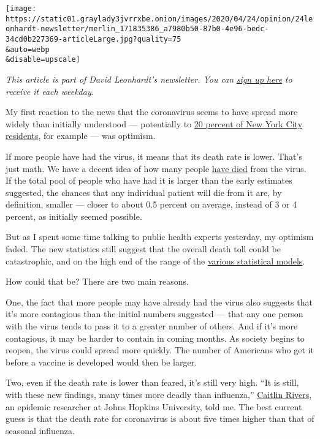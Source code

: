 \texttt{[image: https://static01.graylady3jvrrxbe.onion/images/2020/04/24/opinion/24leonhardt-newsletter/merlin\_171835386\_a7980b50-87b0-4e96-bedc-34cd0b227369-articleLarge.jpg?quality=75\\\&auto=webp\\\&disable=upscale]}

\emph{This article is part of David Leonhardt's newsletter. You can}
\href{https://www.nytimes3xbfgragh.onion/newsletters/opiniontoday?action=click\&module=Intentional\&pgtype=Article}{\emph{sign
up here}} \emph{to receive it each weekday.}

My first reaction to the news that the coronavirus seems to have spread
more widely than initially understood --- potentially to
\href{https://www.nytimes3xbfgragh.onion/2020/04/23/nyregion/coronavirus-antibodies-test-ny.html}{20
percent of New York City residents}, for example --- was optimism.

If more people have had the virus, it means that its death rate is
lower. That's just math. We have a decent idea of how many people
\href{https://coronavirus.jhu.edu/map.html}{have died} from the virus.
If the total pool of people who have had it is larger than the early
estimates suggested, the chances that any individual patient will die
from it are, by definition, smaller --- closer to about 0.5 percent on
average, instead of 3 or 4 percent, as initially seemed possible.

But as I spent some time talking to public health experts yesterday, my
optimism faded. The new statistics still suggest that the overall death
toll could be catastrophic, and on the high end of the range of the
\href{https://www.washingtonpost.com/outlook/2020/04/14/coronavirus-models-ihme-ic/}{various
statistical models}.

How could that be? There are two main reasons.

One, the fact that more people may have already had the virus also
suggests that it's more contagious than the initial numbers suggested
--- that any one person with the virus tends to pass it to a greater
number of others. And if it's more contagious, it may be harder to
contain in coming months. As society begins to reopen, the virus could
spread more quickly. The number of Americans who get it before a vaccine
is developed would then be larger.

Two, even if the death rate is lower than feared, it's still very high.
``It is still, with these new findings, many times more deadly than
influenza,''
\href{https://twitter.com/cmyeaton?ref_src=twsrc\%5Egoogle\%7Ctwcamp\%5Eserp\%7Ctwgr\%5Eauthor}{Caitlin
Rivers}, an epidemic researcher at Johns Hopkins University, told me.
The best current guess is that the death rate for coronavirus is about
five times higher than that of seasonal influenza.

